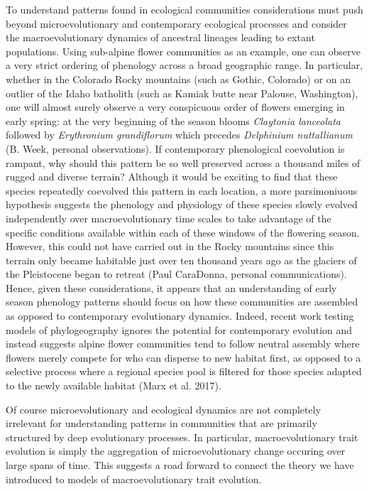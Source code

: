 \documentclass[]{article}
\begin{document}
To understand patterns found in ecological communities considerations
must push beyond microevolutionary and contemporary ecological processes
and consider the macroevolutionary dynamics of ancestral lineages
leading to extant populations. Using sub-alpine flower communities as an
example, one can observe a very strict ordering of phenology across a
broad geographic range. In particular, whether in the Colorado Rocky
mountains (such as Gothic, Colorado) or on an outlier of the Idaho
batholith (such as Kamiak butte near Palouse, Washington), one will
almost surely observe a very conspicuous order of flowers emerging in
early spring: at the very beginning of the season blooms \emph{Claytonia
lanceolata} followed by \emph{Erythronium grandiflorum} which precedes
\emph{Delphinium nuttallianum} (B. Week, personal observations). If
contemporary phenological coevolution is rampant, why should this
pattern be so well preserved across a thousand miles of rugged and
diverse terrain? Although it would be exciting to find that these
species repeatedly coevolved this pattern in each location, a more
parsimoniuous hypothesis suggests the phenology and physiology of these
species slowly evolved independently over macroevolutionary time scales
to take advantage of the specific conditions available within each of
these windows of the flowering season. However, this could not have
carried out in the Rocky mountains since this terrain only became
habitable just over ten thousand years ago as the glaciers of the
Pleistocene began to retreat (Paul CaraDonna, personal communications).
Hence, given these considerations, it appears that an understanding of
early season phenology patterns should focus on how these communities
are assembled as opposed to contemporary evolutionary dynamics. Indeed,
recent work testing models of phylogeography ignores the potential for
contemporary evolution and instead suggests alpine flower communities
tend to follow neutral assembly where flowers merely compete for who can
disperse to new habitat first, as opposed to a selective process where a
regional species pool is filtered for those species adapted to the newly
available habitat (Marx et al. 2017).

Of course microevolutionary and ecological dynamics are not completely
irrelevant for understanding patterns in communities that are primarily
structured by deep evolutionary processes. In particular,
macroevolutionary trait evolution is simply the aggregation of
microevolutionary change occuring over large spans of time. This
suggests a road forward to connect the theory we have introduced to
models of macroevolutionary trait evolution.
\end{document}
